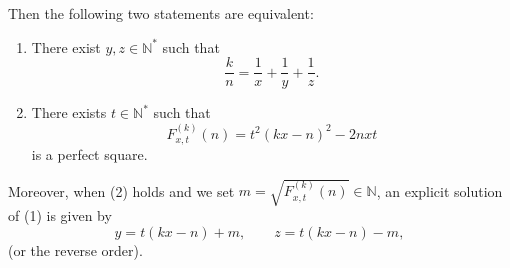 \documentclass[12pt]{article}
\begin{document}
Then the following two statements are equivalent:

\begin{enumerate}
    \item There exist \(y, z \in \mathbb{N}^*\) such that 
    \[
    \frac{k}{n} = \frac{1}{x} + \frac{1}{y} + \frac{1}{z}.
    \]
    
    \item There exists \(t \in \mathbb{N}^*\) such that 
    \[
    F_{x,t}^{(k)}(n) = t^2(kx - n)^2 - 2nxt
    \]
    is a perfect square.
\end{enumerate}

Moreover, when (2) holds and we set 
\(m = \sqrt{F_{x,t}^{(k)}(n)} \in \mathbb{N}\), 
an explicit solution of (1) is given by
\[
y = t(kx - n) + m, \qquad z = t(kx - n) - m,
\]
(or the reverse order).
\end{document}
